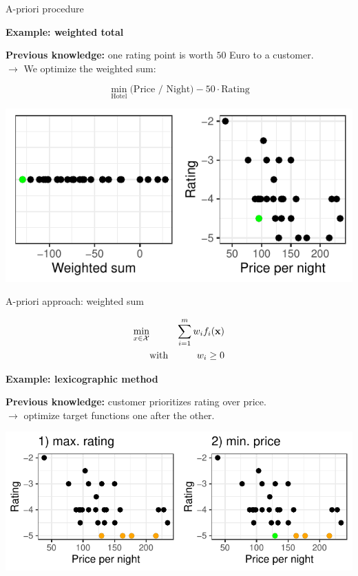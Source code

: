 \begin{frame}[allowframebreaks]{A-priori procedure}

\textbf{Example: weighted total}


\textbf{Previous knowledge: } one rating point is worth $50$ Euro to a customer. \\ $\to$ We optimize the weighted sum:

$$
\min_\text{Hotel} \text{(Price / Night)} - 50 \cdot \text{Rating}
$$

\centering \includegraphics[width=0.7\linewidth,height=0.4\textheight]{images/expedia-9-1}

\framebreak

A-priori approach: weighted sum

\begin{eqnarray*}
\min_{x \in \mathcal{X}} && \sum_{i = 1}^m w_i f_i(\mathbf{x}) \\
&\text{with}& w_i \ge 0
 \end{eqnarray*}


\framebreak

\textbf{Example: lexicographic method}

\lz

\textbf{Previous knowledge: } customer prioritizes rating over price. \\
$\to$ optimize target functions one after the other.

\lz

\centering \includegraphics[width=0.8\linewidth,height=0.4\textheight]{images/expedia-10-1}


\end{frame}
